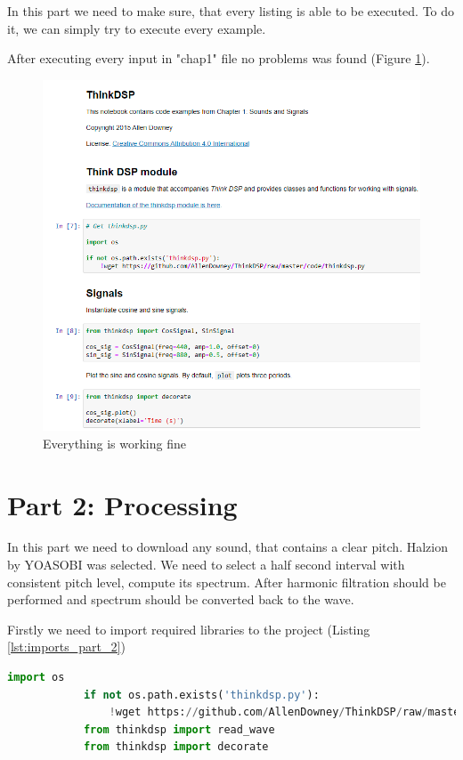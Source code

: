 \documentclass[a4paper]{article}
\begin{document}
        In this part we need to make sure, that every listing is able to be executed. To do it, we can simply try to execute every example.
        
        After executing every input in "chap1" file no problems was found (Figure \ref{fig:work_check}).
        
        \begin{figure}[h]
            \centering
            \includegraphics[width=\textwidth]{img/check.png}
            \caption{Everything is working fine}
            \label{fig:work_check}
        \end{figure}
    
    \newpage
        \section{Part 2: Processing}

        In this part we need to download any sound, that contains a clear pitch. Halzion by YOASOBI
        was selected. We need to select a half second interval with consistent pitch level, compute its spectrum. After harmonic filtration should be performed and spectrum should be converted back to the wave.
        
        Firstly we need to import required libraries to the project (Listing \ref{lst:imports_part_2})
            
        \begin{lstlisting}[language=Python,caption={Libraries import},label={lst:imports_part_2}]
            import os
            if not os.path.exists('thinkdsp.py'):
                !wget https://github.com/AllenDowney/ThinkDSP/raw/master/code/thinkdsp.py
            from thinkdsp import read_wave
            from thinkdsp import decorate
        \end{lstlisting}
        
\end{document}
